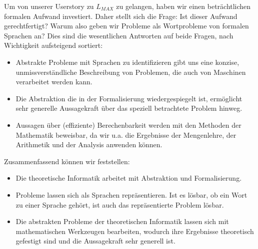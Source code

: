 \noindent
Um von unserer Userstory zu $L_{MAX}$ zu gelangen,
haben wir einen beträchtlichen formalen Aufwand investiert.
Daher stellt sich die Frage: Ist dieser Aufwand gerechtfertigt? 
Warum also geben wir Probleme als Wortprobleme von formalen Sprachen an?
Dies sind die wesentlichen Antworten auf beide Fragen,
nach Wichtigkeit aufsteigend sortiert:
\begin{itemize}
    \item Abstrakte Probleme mit Sprachen zu identifizieren gibt uns eine
        konzise, unmissverständliche Beschreibung von Problemen,
        die auch von Maschinen verarbeitet werden kann. 
    \item Die Abstraktion die in der Formalisierung wiedergespiegelt ist,
        ermöglicht sehr generelle Aussagekraft über das speziell betrachtete Problem hinweg.
    \item Aussagen über (effiziente) Berechenbarkeit werden mit den Methoden der Mathematik
        beweisbar, da wir u.a. die Ergebnisse der Mengenlehre, der Arithmetik
        und der Analysis anwenden können.
\end{itemize}

Zusammenfassend können wir feststellen:
\begin{itemize}
    \item Die theoretische Informatik arbeitet mit Abstraktion und Formalisierung.
    \item Probleme lassen sich als Sprachen repräsentieren.
        Ist es lösbar, ob ein Wort zu einer Sprache gehört,
        ist auch das repräsentierte Problem lösbar. 
    \item Die abstrakten Probleme der theoretischen Informatik lassen sich mit
        mathematischen Werkzeugen bearbeiten,
        wodurch ihre Ergebnisse theoretisch gefestigt sind 
        und die Aussagekraft sehr generell ist.
\end{itemize}
